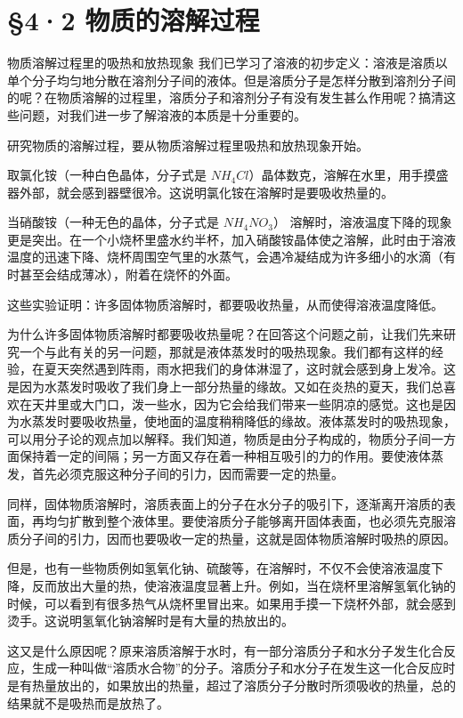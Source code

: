 \section{§4·2 物质的溶解过程}

物质溶解过程里的吸热和放热现象
我们已学习了溶液的初步定义：溶液是溶质以单个分子均匀地分散在溶剂分子间的液体。但是溶质分子是怎样分散到溶剂分子间的呢？在物质溶解的过程里，溶质分子和溶剂分子有没有发生甚么作用呢？搞清这些问题，对我们进一步了解溶液的本质是十分重要的。

研究物质的溶解过程，要从物质溶解过程里吸热和放热现象开始。

取氯化铵（一种白色晶体，分子式是
\(NH_{4}Cl\)）晶体数克，溶解在水里，用手摸盛器外部，就会感到器壁很冷。这说明氯化铵在溶解时是要吸收热量的。

当硝酸铵（一种无色的晶体，分子式是 \(NH_{4}NO_{3}\)）
溶解时，溶液温度下降的现象更是突出。在一个小烧杯里盛水约半杯，加入硝酸铵晶体使之溶解，此时由于溶液温度的迅速下降、烧杯周围空气里的水蒸气，会遇冷凝结成为许多细小的水滴（有时甚至会结成薄冰），附着在烧怀的外面。

这些实验证明：许多固体物质溶解时，都要吸收热量，从而使得溶液温度降低。

为什么许多固体物质溶解时都要吸收热量呢？在回答这个问题之前，让我们先来研究一个与此有关的另一问题，那就是液体蒸发时的吸热现象。我们都有这样的经验，在夏天突然遇到阵雨，雨水把我们的身体淋湿了，这时就会感到身上发冷。这是因为水蒸发时吸收了我们身上一部分热量的缘故。又如在炎热的夏天，我们总喜欢在天井里或大门口，泼一些水，因为它会给我们带来一些阴凉的感觉。这也是因为水蒸发时要吸收热量，使地面的温度稍稍降低的缘故。液体蒸发时的吸热现象，可以用分子论的观点加以解释。我们知道，物质是由分子构成的，物质分子间一方面保持着一定的间隔；另一方面又存在着一种相互吸引的力的作用。要使液体蒸发，首先必须克服这种分子间的引力，因而需要一定的热量。

同样，固体物质溶解时，溶质表面上的分子在水分子的吸引下，逐渐离开溶质的表面，再均匀扩散到整个液体里。要使溶质分子能够离开固体表面，也必须先克服溶质分子间的引力，因而也要吸收一定的热量，这就是固体物质溶解时吸热的原因。

但是，也有一些物质例如氢氧化钠、硫酸等，在溶解时，不仅不会使溶液温度下降，反而放出大量的热，使溶液温度显著上升。例如，当在烧杯里溶解氢氧化钠的时候，可以看到有很多热气从烧杯里冒出来。如果用手摸一下烧杯外部，就会感到烫手。这说明氢氧化钠溶解时是有大量的热放出的。

这又是什么原因呢？原来溶质溶解于水时，有一部分溶质分子和水分子发生化合反应，生成一种叫做``溶质水合物''的分子。溶质分子和水分子在发生这一化合反应时是有热量放出的，如果放出的热量，超过了溶质分子分散时所须吸收的热量，总的结果就不是吸热而是放热了。

